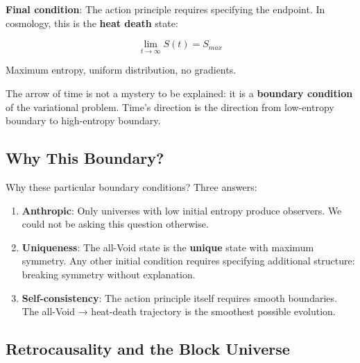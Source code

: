 \documentclass[
  11pt,
  letterpaper,
  twoside,
  openright]{book}
\begin{document}
\textbf{Final condition}: The action principle requires specifying the
endpoint. In cosmology, this is the \textbf{heat death} state:

\[\lim_{t \to \infty} S(t) = S_{max}\]

Maximum entropy, uniform distribution, no gradients.

\begin{tcolorbox}[enhanced jigsaw, leftrule=.75mm, title=\textcolor{quarto-callout-important-color}{\faExclamation}\hspace{0.5em}{The Arrow is Geometric}, bottomrule=.15mm, opacityback=0, coltitle=black, arc=.35mm, colframe=quarto-callout-important-color-frame, colbacktitle=quarto-callout-important-color!10!white, colback=white, titlerule=0mm, breakable, bottomtitle=1mm, toptitle=1mm, rightrule=.15mm, toprule=.15mm, left=2mm, opacitybacktitle=0.6]

The arrow of time is not a mystery to be explained: it is a
\textbf{boundary condition} of the variational problem. Time's direction
is the direction from low-entropy boundary to high-entropy boundary.

\end{tcolorbox}

\subsection{Why This Boundary?}\label{why-this-boundary}

Why these particular boundary conditions? Three answers:

\begin{enumerate}
\def\labelenumi{\arabic{enumi}.}
\item
  \textbf{Anthropic}: Only universes with low initial entropy produce
  observers. We could not be asking this question otherwise.
\item
  \textbf{Uniqueness}: The all-Void state is the \textbf{unique} state
  with maximum symmetry. Any other initial condition requires specifying
  additional structure: breaking symmetry without explanation.
\item
  \textbf{Self-consistency}: The action principle itself requires smooth
  boundaries. The all-Void → heat-death trajectory is the smoothest
  possible evolution.
\end{enumerate}

\subsection{Retrocausality and the Block
Universe}\label{retrocausality-and-the-block-universe}
\end{document}
